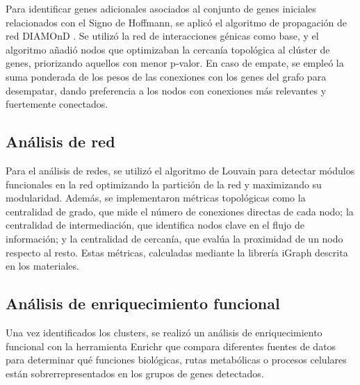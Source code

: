 Para identificar genes adicionales asociados al conjunto de genes iniciales relacionados con el Signo de Hoffmann, se aplicó el algoritmo de propagación de red DIAMOnD \cite{Ghiassian2015}. Se utilizó la red de interacciones génicas como base, y el algoritmo añadió nodos que optimizaban la cercanía topológica al clúster de genes, priorizando aquellos con menor p-valor. En caso de empate, se empleó la suma ponderada de los pesos de las conexiones con los genes del grafo para desempatar, dando preferencia a los nodos con conexiones más relevantes y fuertemente conectados.


\subsection{Análisis de red}

Para el análisis de redes, se utilizó el algoritmo de Louvain \cite{Blondel2008} para detectar módulos funcionales en la red optimizando la partición de la red y maximizando su modularidad. Además, se implementaron métricas topológicas como la centralidad de grado, que mide el número de conexiones directas de cada nodo; la centralidad de intermediación, que identifica nodos clave en el flujo de información; y la centralidad de cercanía, que evalúa la proximidad de un nodo respecto al resto. Estas métricas, calculadas mediante la librería iGraph descrita en los materiales.

\subsection{Análisis de enriquecimiento funcional}

Una vez identificados los clusters, se realizó un análisis de enriquecimiento funcional con la herramienta Enrichr \cite{10.1093/nar/gkad393/1} que compara diferentes fuentes de datos para determinar qué funciones biológicas, rutas metabólicas o procesos celulares están sobrerrepresentados en los grupos de genes detectados.
